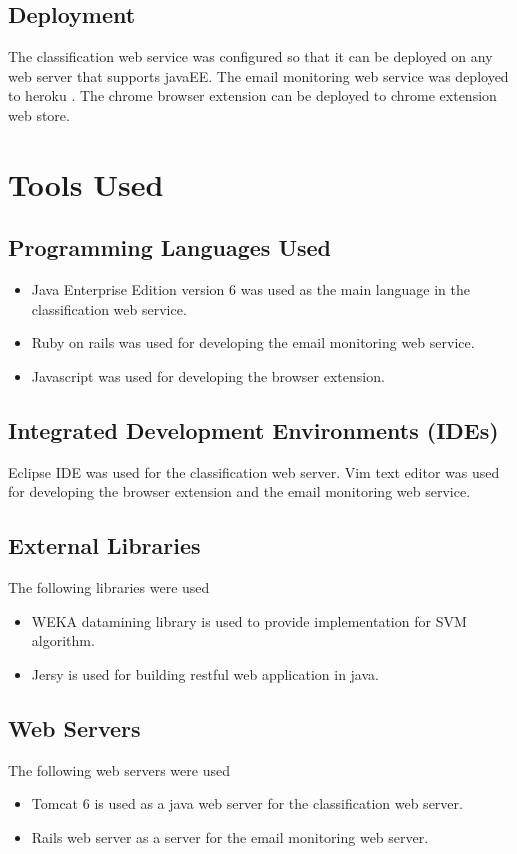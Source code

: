 \subsection{Deployment}
The classification web service was configured so that it can be deployed on any 
web server that supports javaEE. The email monitoring web service was deployed 
to heroku \cite{HEROKU}. The chrome browser extension can be deployed to chrome 
extension web store.

\section{Tools Used}

\subsection{Programming Languages Used}
\begin{itemize}
  \item Java Enterprise Edition version 6 was used as the main language in the 
  classification web service.
  \item Ruby on rails \cite{ROR} was used for developing the email monitoring 
  web service.
  \item Javascript was used for developing the browser extension.
\end{itemize}

\subsection{Integrated Development Environments (IDEs)}
Eclipse IDE was used for the classification web server.
Vim text editor was used for developing the browser extension and the email 
monitoring web service.

\subsection{External Libraries}
The following libraries were used
\begin{itemize}
  \item WEKA \cite{WEKA} datamining library is used to provide implementation for SVM algorithm.
  \item Jersy \cite{JERSY} is used for building restful web application in java.
\end{itemize}


\subsection{Web Servers}
The following web servers were used
\begin{itemize}
  \item Tomcat 6 is used as a java web server for the classification web server.
  \item Rails web server as a server for the email monitoring web server.
\end{itemize}

